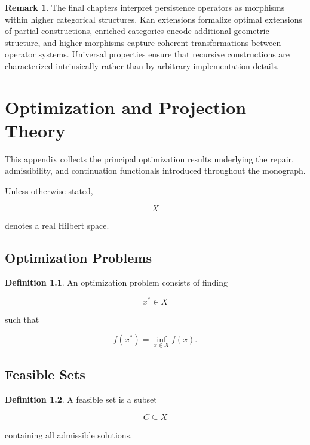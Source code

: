 \documentclass[11pt]{book}
\numberwithin{equation}{chapter}
\theoremstyle{definition}
\newtheorem{definition}{Definition}[chapter]
\newtheorem{remark}[definition]{Remark}
\theoremstyle{plain}
\begin{document}
\begin{remark}

The final chapters interpret persistence operators as morphisms within
higher categorical structures. Kan extensions formalize optimal
extensions of partial constructions, enriched categories encode
additional geometric structure, and higher morphisms capture coherent
transformations between operator systems. Universal properties ensure
that recursive constructions are characterized intrinsically rather than
by arbitrary implementation details.

\end{remark}

\chapter{Optimization and Projection Theory}

This appendix collects the principal optimization results underlying the
repair, admissibility, and continuation functionals introduced
throughout the monograph.

Unless otherwise stated,

\[
X
\]

denotes a real Hilbert space.


\section{Optimization Problems}

\begin{definition}

An optimization problem consists of finding

\[
x^*
\in X
\]

such that

\[
f(x^*)
=
\inf_{x\in X}
f(x).
\]

\end{definition}


\section{Feasible Sets}

\begin{definition}

A feasible set is a subset

\[
C
\subseteq
X
\]

containing all admissible solutions.

\end{definition}
\end{document}
